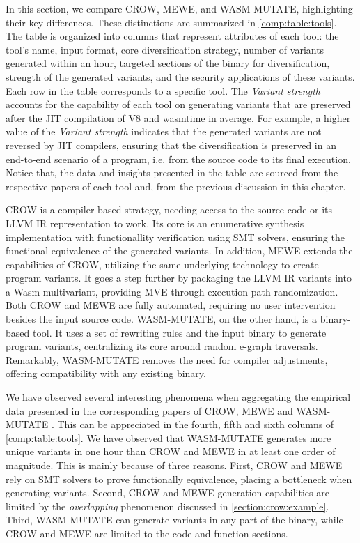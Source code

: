 
\label{discussion}

In this section, we compare CROW, MEWE, and WASM-MUTATE, highlighting their key differences. 
These distinctions are summarized in \autoref{comp:table:tools}. 
The table is organized into columns that represent attributes of each tool: the tool's name, input format, core diversification strategy, number of variants generated within an hour, targeted sections of the \Wasm binary for diversification, strength of the generated variants, and the security applications of these variants. 
Each row in the table corresponds to a specific tool. 
The \emph{Variant strength} accounts for the capability of each tool on generating variants that are preserved after the JIT compilation of V8 and wasmtime in average.
For example, a higher value of the \emph{Variant strength} indicates that the generated variants are not reversed by JIT compilers, ensuring that the diversification is preserved in an end-to-end scenario of a \Wasm program, i.e. from the source code to its final execution.
Notice that, the data and insights presented in the table are sourced from the respective papers of each tool and, from the previous discussion in this chapter.


CROW is a compiler-based strategy, needing access to the source code or its LLVM IR representation to work. 
Its core is an enumerative synthesis implementation with functionallity verification using SMT solvers, ensuring the functional equivalence of the generated variants.
In addition, MEWE extends the capabilities of CROW, utilizing the same underlying technology to create program variants. 
It goes a step further by packaging the LLVM IR variants into a Wasm multivariant, providing MVE through execution path randomization.
Both CROW and MEWE are fully automated, requiring no user intervention besides the input source code.
WASM-MUTATE, on the other hand, is a binary-based tool.
It uses a set of rewriting rules and the input \wasm binary to generate program variants, centralizing its core around random e-graph traversals. 
Remarkably, WASM-MUTATE removes the need for compiler adjustments, offering compatibility with any existing \Wasm binary. 


We have observed several interesting phenomena when aggregating the empirical data presented in the corresponding papers of CROW, MEWE and WASM-MUTATE \cite{CROW,MEWE, wasmmutate}. 
This can be appreciated in the fourth, fifth and sixth columns of \autoref{comp:table:tools}.
We have observed that WASM-MUTATE generates more unique variants in one hour than CROW and MEWE in at least one order of magnitude.
This is mainly because of three reasons.
First, CROW and MEWE rely on SMT solvers to prove functionally equivalence, placing a bottleneck when generating variants.
Second, CROW and MEWE generation capabilities are limited by the \emph{overlapping} phenomenon discussed in \autoref{section:crow:example}.
Third, WASM-MUTATE can generate variants in any part of the \wasm binary, while CROW and MEWE are limited to the code and function sections.


